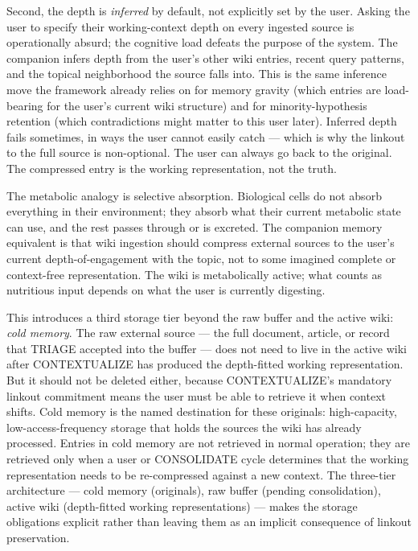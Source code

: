 \documentclass[
  11pt,
]{article}
\begin{document}
Second, the depth is \emph{inferred} by default, not explicitly set by
the user. Asking the user to specify their working-context depth on
every ingested source is operationally absurd; the cognitive load
defeats the purpose of the system. The companion infers depth from the
user's other wiki entries, recent query patterns, and the topical
neighborhood the source falls into. This is the same inference move the
framework already relies on for memory gravity (which entries are
load-bearing for the user's current wiki structure) and for
minority-hypothesis retention (which contradictions might matter to this
user later). Inferred depth fails sometimes, in ways the user cannot
easily catch --- which is why the linkout to the full source is
non-optional. The user can always go back to the original. The
compressed entry is the working representation, not the truth.

The metabolic analogy is selective absorption. Biological cells do not
absorb everything in their environment; they absorb what their current
metabolic state can use, and the rest passes through or is excreted. The
companion memory equivalent is that wiki ingestion should compress
external sources to the user's current depth-of-engagement with the
topic, not to some imagined complete or context-free representation. The
wiki is metabolically active; what counts as nutritious input depends on
what the user is currently digesting.

This introduces a third storage tier beyond the raw buffer and the
active wiki: \emph{cold memory}. The raw external source --- the full
document, article, or record that TRIAGE accepted into the buffer ---
does not need to live in the active wiki after CONTEXTUALIZE has
produced the depth-fitted working representation. But it should not be
deleted either, because CONTEXTUALIZE's mandatory linkout commitment
means the user must be able to retrieve it when context shifts. Cold
memory is the named destination for these originals: high-capacity,
low-access-frequency storage that holds the sources the wiki has already
processed. Entries in cold memory are not retrieved in normal operation;
they are retrieved only when a user or CONSOLIDATE cycle determines that
the working representation needs to be re-compressed against a new
context. The three-tier architecture --- cold memory (originals), raw
buffer (pending consolidation), active wiki (depth-fitted working
representations) --- makes the storage obligations explicit rather than
leaving them as an implicit consequence of linkout preservation.
\end{document}
